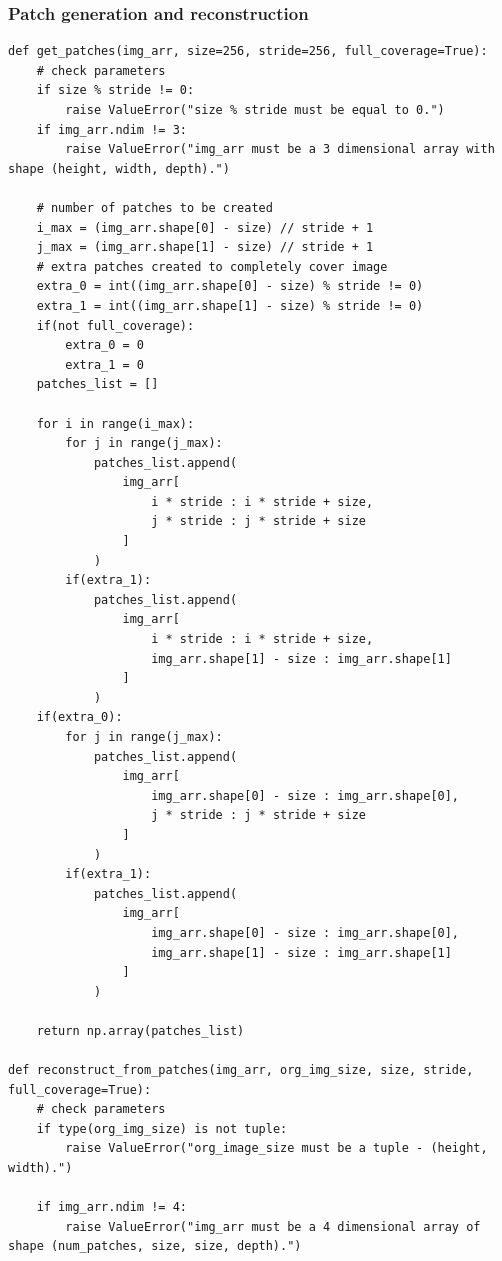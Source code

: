 \documentclass[12pt, a4paper]{report}
\begin{document}
\subsubsection*{Patch generation and reconstruction}
\begin{verbatim}
def get_patches(img_arr, size=256, stride=256, full_coverage=True):
    # check parameters
    if size % stride != 0:
        raise ValueError("size % stride must be equal to 0.")
    if img_arr.ndim != 3:
        raise ValueError("img_arr must be a 3 dimensional array with shape (height, width, depth).")

    # number of patches to be created
    i_max = (img_arr.shape[0] - size) // stride + 1
    j_max = (img_arr.shape[1] - size) // stride + 1
    # extra patches created to completely cover image
    extra_0 = int((img_arr.shape[0] - size) % stride != 0)
    extra_1 = int((img_arr.shape[1] - size) % stride != 0)
    if(not full_coverage):
        extra_0 = 0
        extra_1 = 0
    patches_list = []

    for i in range(i_max):
        for j in range(j_max):
            patches_list.append(
                img_arr[
                    i * stride : i * stride + size,
                    j * stride : j * stride + size
                ]
            )
        if(extra_1):
            patches_list.append(
                img_arr[
                    i * stride : i * stride + size,
                    img_arr.shape[1] - size : img_arr.shape[1]
                ]
            )
    if(extra_0):
        for j in range(j_max):
            patches_list.append(
                img_arr[
                    img_arr.shape[0] - size : img_arr.shape[0],
                    j * stride : j * stride + size
                ]
            )
        if(extra_1):
            patches_list.append(
                img_arr[
                    img_arr.shape[0] - size : img_arr.shape[0],
                    img_arr.shape[1] - size : img_arr.shape[1]
                ]
            )

    return np.array(patches_list)

def reconstruct_from_patches(img_arr, org_img_size, size, stride, full_coverage=True):
    # check parameters
    if type(org_img_size) is not tuple:
        raise ValueError("org_image_size must be a tuple - (height, width).")

    if img_arr.ndim != 4:
        raise ValueError("img_arr must be a 4 dimensional array of shape (num_patches, size, size, depth).")
    

\end{verbatim}
\end{document}

